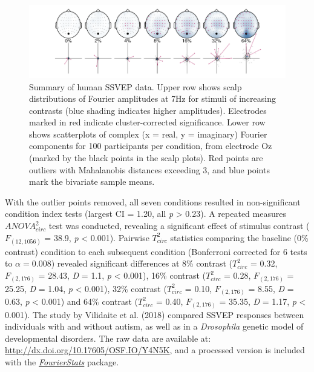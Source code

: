 \documentclass[]{article}
\begin{document}
\begin{figure}

{\centering \includegraphics{figures/humanSSVEP} 

}

\caption{Summary of human SSVEP data. Upper row shows scalp distributions of Fourier amplitudes at 7Hz for stimuli of increasing contrasts (blue shading indicates higher amplitudes). Electrodes marked in red indicate cluster-corrected significance.  Lower row shows scatterplots of complex (x = real, y = imaginary) Fourier components for 100 participants per condition, from electrode Oz (marked  by the black points in the scalp plots). Red points are outliers with Mahalanobis distances exceeding 3, and blue points mark the bivariate sample means.}\label{fig:humanSSVEP}
\end{figure}

With the outlier points removed, all seven conditions resulted in non-significant condition index tests (largest CI = 1.20, all \emph{p} \textgreater{} 0.23). A repeated measures \(ANOVA^2_{circ}\) test was conducted, revealing a significant effect of stimulus contrast (\(F_{(12,1056)}\) = 38.9, \emph{p} \textless{} 0.001). Pairwise \(T^2_{circ}\) statistics comparing the baseline (0\% contrast) condition to each subsequent condition (Bonferroni corrected for 6 tests to \(\alpha = 0.008\)) revealed significant differences at 8\% contrast (\(T^2_{circ}\) = 0.32, \(F_{(2,176)}\) = 28.43, \emph{D} = 1.1, \emph{p} \textless{} 0.001), 16\% contrast (\(T^2_{circ}\) = 0.28, \(F_{(2,176)}\) = 25.25, \emph{D} = 1.04, \emph{p} \textless{} 0.001), 32\% contrast (\(T^2_{circ}\) = 0.10, \(F_{(2,176)}\) = 8.55, \emph{D} = 0.63, \emph{p} \textless{} 0.001) and 64\% contrast (\(T^2_{circ}\) = 0.40, \(F_{(2,176)}\) = 35.35, \emph{D} = 1.17, \emph{p} \textless{} 0.001). The study by Vilidaite et al. (2018) compared SSVEP responses between individuals with and without autism, as well as in a \emph{Drosophila} genetic model of developmental disorders. The raw data are available at: \url{http://dx.doi.org/10.17605/OSF.IO/Y4N5K}, and a processed version is included with the \href{https://github.com/bakerdh/FourierStats}{\emph{FourierStats}} package.
\end{document}
